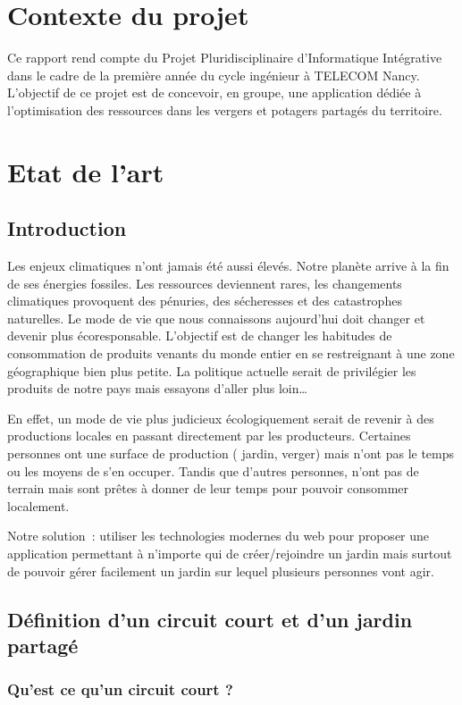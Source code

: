 \documentclass[french,a4paper]{article}
\begin{document}
\section{Contexte du projet}
Ce rapport rend compte du Projet Pluridisciplinaire d’Informatique Intégrative dans le cadre de la première année du cycle ingénieur à TELECOM Nancy.
L’objectif de ce projet est de concevoir, en groupe,  une application dédiée à l’optimisation des ressources dans les vergers et potagers partagés du territoire.

\newpage
\section{Etat de l'art}
\subsection{Introduction}
Les enjeux climatiques n’ont jamais été aussi élevés. Notre planète arrive à la fin de ses énergies fossiles. Les ressources deviennent rares, les changements climatiques provoquent des pénuries, des sécheresses et des catastrophes naturelles. Le mode de vie que nous connaissons aujourd’hui doit changer et devenir plus écoresponsable. L’objectif est de changer les habitudes de consommation de produits venants du monde entier en se restreignant à une zone géographique bien plus petite. La politique actuelle serait de privilégier les produits de notre pays mais essayons d’aller plus loin…

En effet, un mode de vie plus judicieux écologiquement serait de revenir à des productions locales en passant directement par les producteurs. Certaines personnes ont une surface de production ( jardin, verger) mais n’ont pas le temps ou les moyens de s’en occuper. Tandis que d’autres personnes, n’ont pas de terrain mais sont prêtes à donner de leur temps pour pouvoir consommer localement.

Notre solution~: utiliser les technologies modernes du web pour proposer une application permettant à n’importe qui de créer/rejoindre un jardin mais surtout de pouvoir gérer facilement un jardin sur lequel plusieurs personnes vont agir.

\subsection{Définition d’un circuit court et d’un jardin partagé}
\subsubsection{Qu’est ce qu’un circuit court ?}
\end{document}
